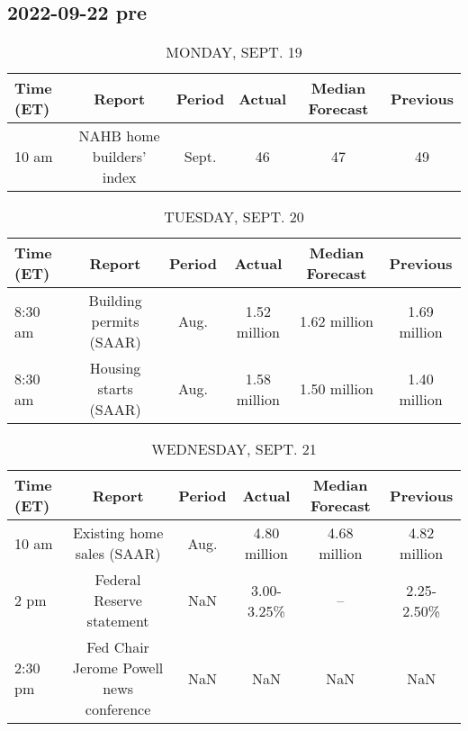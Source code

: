 \documentclass{book}
\begin{document}
  
  

  
  \subsection{ 2022-09-22 pre }
  \normalsize%
  
  
  \begin{table}[htbp]%
  \caption{MONDAY, SEPT. 19}%
  \centering%
  \begin{adjustbox}{width=1\textwidth}%
  \begin{tabular}{lccccc}
  \toprule
  Time (ET) &                    Report & Period & Actual & Median Forecast & Previous \\
  \midrule
      10 am & NAHB home builders' index &  Sept. &     46 &              47 &       49 \\
  \bottomrule
  \end{tabular}
  \end{adjustbox}%
  \end{table}
  
  
  
  \begin{table}[htbp]%
  \caption{TUESDAY, SEPT. 20}%
  \centering%
  \begin{adjustbox}{width=1\textwidth}%
  \begin{tabular}{lccccc}
  \toprule
  Time (ET) &                  Report & Period &       Actual & Median Forecast &     Previous \\
  \midrule
    8:30 am & Building permits (SAAR) &   Aug. & 1.52 million &    1.62 million & 1.69 million \\
    8:30 am &   Housing starts (SAAR) &   Aug. & 1.58 million &    1.50 million & 1.40 million \\
  \bottomrule
  \end{tabular}
  \end{adjustbox}%
  \end{table}
  
  
  
  \begin{table}[htbp]%
  \caption{WEDNESDAY, SEPT. 21}%
  \centering%
  \begin{adjustbox}{width=1\textwidth}%
  \begin{tabular}{lccccc}
  \toprule
  Time (ET) &                                  Report & Period &       Actual & Median Forecast &     Previous \\
  \midrule
      10 am &              Existing home sales (SAAR) &   Aug. & 4.80 million &    4.68 million & 4.82 million \\
       2 pm &               Federal Reserve statement &    NaN &   3.00-3.25\% &              -- &   2.25-2.50\% \\
    2:30 pm & Fed Chair Jerome Powell news conference &    NaN &          NaN &             NaN &          NaN \\
  \bottomrule
  \end{tabular}
  \end{adjustbox}%
  \end{table}
  
\end{document}
